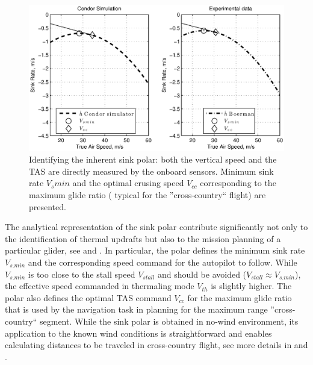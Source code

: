 \documentclass{ifacconf}
\begin{document}
\begin{figure}[thpb]
  \centering
  \includegraphics[scale=0.49]{Figures/Condor_Boermans_comparison.eps}
  \caption{Identifying the inherent sink polar: both the vertical speed and the TAS are directly measured by the onboard sensors. Minimum sink rate $V_s min$ and the optimal crusing speed $V_{cc}$ corresponding to the maximum glide ratio ( typical for the ''cross-country`` flight) are presented.}
  \label{fig:SinkPolar}
\end{figure}

The analytical representation of the sink polar contribute significantly not only to the identification of thermal updrafts but also to the mission planning of a particular glider, see \cite{Piggott:1997} and \cite{FAA:2011}. In particular, the polar defines the minimum sink rate $V_{s.min}$ and the corresponding speed command for the autopilot to follow. While $V_{s.min}$ is too close to the stall speed $V_{stall}$ and should be avoided ($V_{stall} \approx V_{s.min}$), the effective speed commanded in thermaling mode $V_{th}$ is slightly higher. The polar also defines the optimal TAS command  $V_{cc}$ for the maximum glide ratio that is used by the navigation task in planning for the maximum range ''cross-country`` segment. While the sink polar is obtained in no-wind environment, its application to the known wind conditions is straightforward and enables calculating distances to be traveled in cross-country flight, see more details in \cite{Piggott:1997} and \cite{FAA:2011}.
\end{document}
